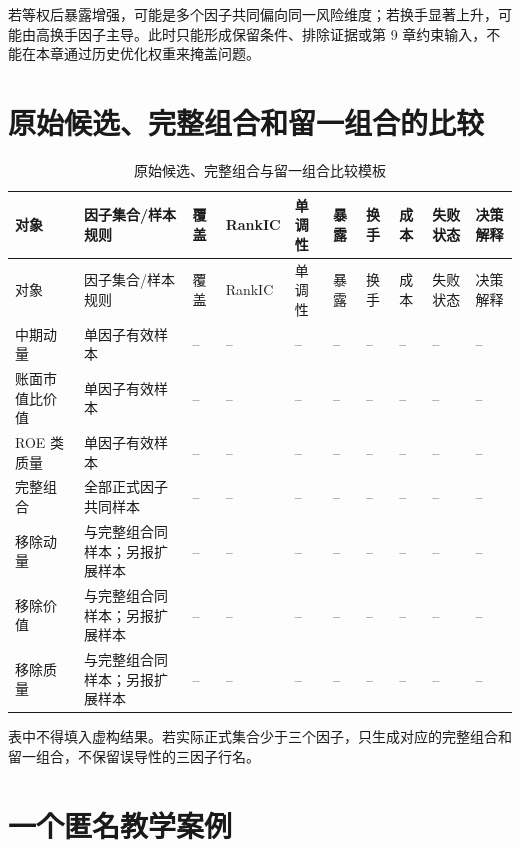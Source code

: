 若等权后暴露增强，可能是多个因子共同偏向同一风险维度；若换手显著上升，可能由高换手因子主导。此时只能形成保留条件、排除证据或第 9 章约束输入，不能在本章通过历史优化权重来掩盖问题。

\section{原始候选、完整组合和留一组合的比较}

\begingroup
\scriptsize
\setlength{\tabcolsep}{2.2pt}
\begin{longtable}{@{}p{2.0cm}p{2.2cm}p{1.05cm}p{1.05cm}p{1.0cm}p{1.0cm}p{1.0cm}p{1.0cm}p{1.1cm}p{1.6cm}@{}}
\caption{原始候选、完整组合与留一组合比较模板}\label{tab:ch08-ablation-template}\\
\toprule
对象 & 因子集合/样本规则 & 覆盖 & RankIC & 单调性 & 暴露 & 换手 & 成本 & 失败状态 & 决策解释 \\
\midrule
\endfirsthead
\toprule
对象 & 因子集合/样本规则 & 覆盖 & RankIC & 单调性 & 暴露 & 换手 & 成本 & 失败状态 & 决策解释 \\
\midrule
\endhead
中期动量 & 单因子有效样本 & -- & -- & -- & -- & -- & -- & -- & -- \\
账面市值比价值 & 单因子有效样本 & -- & -- & -- & -- & -- & -- & -- & -- \\
ROE 类质量 & 单因子有效样本 & -- & -- & -- & -- & -- & -- & -- & -- \\
完整组合 & 全部正式因子共同样本 & -- & -- & -- & -- & -- & -- & -- & -- \\
移除动量 & 与完整组合同样本；另报扩展样本 & -- & -- & -- & -- & -- & -- & -- & -- \\
移除价值 & 与完整组合同样本；另报扩展样本 & -- & -- & -- & -- & -- & -- & -- & -- \\
移除质量 & 与完整组合同样本；另报扩展样本 & -- & -- & -- & -- & -- & -- & -- & -- \\
\bottomrule
\end{longtable}
\endgroup

表中不得填入虚构结果。若实际正式集合少于三个因子，只生成对应的完整组合和留一组合，不保留误导性的三因子行名。

\section{一个匿名教学案例}

